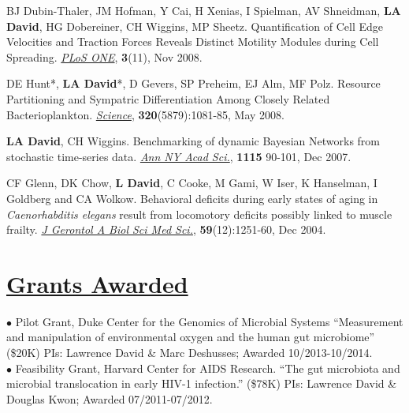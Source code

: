 \documentclass[overlapped,line,11pt]{res}
\begin{document}
\begin{resume}
\begin{revnumerate}[11]
\vspace*{1mm}
\item { BJ Dubin-Thaler, JM Hofman, Y Cai, H Xenias, I Spielman, AV
  Shneidman, \textbf{LA David}, HG Dobereiner, CH Wiggins, MP Sheetz.
  Quantification of Cell Edge Velocities and Traction Forces Reveals
  Distinct Motility Modules during Cell Spreading. \emph{\underline{PLoS ONE}},
  \textbf{3}(11), Nov 2008.}

\vspace*{1mm}
\item {DE Hunt*, \textbf{LA David}*, D Gevers, SP Preheim, EJ Alm, MF
Polz.  Resource Partitioning and Sympatric Differentiation Among
Closely Related Bacterioplankton.  \emph{\underline{Science}},
\textbf{320}(5879):1081-85, May 2008.}

\vspace*{1mm}
\item {\textbf{LA David}, CH Wiggins. Benchmarking of dynamic Bayesian
  Networks from stochastic time-series data. \emph{\underline{Ann NY Acad Sci.}},
  \textbf{1115} 90-101, Dec 2007.}

\vspace*{1mm}
\item {CF Glenn, DK Chow, \textbf{L David}, C Cooke, M Gami, W Iser, K
  Hanselman, I Goldberg and CA Wolkow. Behavioral deficits during
  early states of aging in {\em Caenorhabditis elegans} result from
  locomotory deficits possibly linked to muscle frailty. \emph{\underline{J
    Gerontol A Biol Sci Med Sci.}}, \textbf{59}(12):1251-60, Dec 2004.}
\end{revnumerate}

\section{\underline{\sc Grants Awarded}} 
\vspace{.05in}

\hangindent=0.5in $\bullet$\hspace{.1in} Pilot Grant, Duke Center for
the Genomics of Microbial Systems ``Measurement and manipulation of
environmental oxygen and the human gut microbiome'' (\$20K) PIs:
Lawrence David \& Marc Deshusses; Awarded 10/2013-10/2014. \\

\vspace{-10mm}
\hangindent=0.5in $\bullet$\hspace{.1in} Feasibility Grant, Harvard
Center for AIDS Research. ``The gut microbiota and microbial
translocation in early HIV-1 infection.'' (\$78K) PIs: Lawrence David
\& Douglas Kwon; Awarded 07/2011-07/2012. \\


\end{resume}
\end{document}
